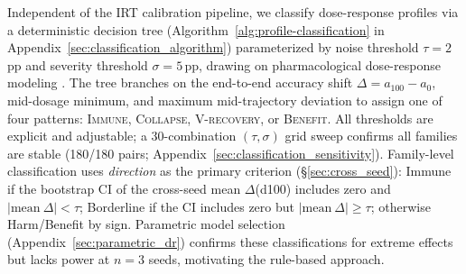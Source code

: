 Independent of the IRT calibration pipeline, we classify dose-response profiles via a deterministic decision tree (Algorithm~\ref{alg:profile-classification} in Appendix~\ref{sec:classification_algorithm}) parameterized by noise threshold $\tau{=}2$\,pp and severity threshold $\sigma{=}5$\,pp, drawing on pharmacological dose-response modeling \citep{hill1910aggregation,ritz2015dose}. The tree branches on the end-to-end accuracy shift $\Delta{=}a_{100}{-}a_0$, mid-dosage minimum, and maximum mid-trajectory deviation to assign one of four patterns: \textsc{Immune}, \textsc{Collapse}, \textsc{V-recovery}, or \textsc{Benefit}. All thresholds are explicit and adjustable; a 30-combination $(\tau, \sigma)$ grid sweep confirms all families are stable (180/180 pairs; Appendix~\ref{sec:classification_sensitivity}). Family-level classification uses \emph{direction} as the primary criterion (\S\ref{sec:cross_seed}): Immune if the bootstrap CI of the cross-seed mean $\Delta$(d100) includes zero and $|\text{mean}~\Delta| < \tau$; Borderline if the CI includes zero but $|\text{mean}~\Delta| \geq \tau$; otherwise Harm/Benefit by sign. Parametric model selection (Appendix~\ref{sec:parametric_dr}) confirms these classifications for extreme effects but lacks power at $n\!=\!3$ seeds, motivating the rule-based approach.